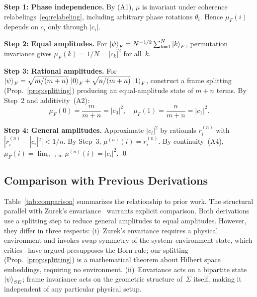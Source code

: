 \documentclass[aps,prd,twocolumn,superscriptaddress,nofootinbib,floatfix]{revtex4-2}
\newcommand{\Sig}{\Sigma}
\begin{document}
\textbf{Step 1: Phase independence.} By (A1), $\mu$ is invariant under coherence relabelings~\eqref{eq:relabeling}, including arbitrary phase rotations $\theta_i$. Hence $\mu_F(i)$ depends on $c_i$ only through $|c_i|$.

\textbf{Step 2: Equal amplitudes.} For $\ket{\psi}_F = N^{-1/2}\sum_{k=1}^N \ket{k}_F$, permutation invariance gives $\mu_F(k) = 1/N = |c_k|^2$ for all~$k$.

\textbf{Step 3: Rational amplitudes.} For $\ket{\psi}_F = \sqrt{m/(m+n)}\,\ket{0}_F + \sqrt{n/(m+n)}\,\ket{1}_F$, construct a frame splitting (Prop.~\ref{prop:splitting}) producing an equal-amplitude state of $m+n$ terms. By Step~2 and additivity~(A2):
\begin{equation}
\mu_F(0) = \frac{m}{m+n} = |c_0|^2, \quad \mu_F(1) = \frac{n}{m+n} = |c_1|^2.
\end{equation}

\textbf{Step 4: General amplitudes.} Approximate $|c_i|^2$ by rationals $r_i^{(n)}$ with $|r_i^{(n)} - |c_i|^2| < 1/n$. By Step~3, $\mu^{(n)}(i) = r_i^{(n)}$. By continuity~(A4), $\mu_F(i) = \lim_{n \to \infty} \mu^{(n)}(i) = |c_i|^2$.  \qed

\subsection{Comparison with Previous Derivations}

Table~\ref{tab:comparison} summarizes the relationship to prior work. The structural parallel with Zurek's envariance~\cite{zurekProbabilitiesEntanglementBorns2005} warrants explicit comparison. Both derivations use a splitting step to reduce general amplitudes to equal amplitudes. However, they differ in three respects: (i)~Zurek's envariance requires a physical environment and invokes swap symmetry of the system--environment state, which critics~\cite{zurekDecoherenceEinselectionQuantum2003} have argued presupposes the Born rule; our splitting (Prop.~\ref{prop:splitting}) is a mathematical theorem about Hilbert space embeddings, requiring no environment. (ii)~Envariance acts on a bipartite state $\ket{\psi}_{SE}$; frame invariance acts on the geometric structure of~$\Sig$ itself, making it independent of any particular physical setup.
\end{document}
